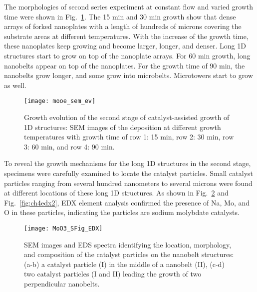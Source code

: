 The morphologies of second series experiment at constant  flow and varied growth time were shown in Fig.~\ref{fig:ch4ev}. The 15 min and 30 min growth show that dense arrays of  forked nanoplates with a length of hundreds of microns covering the substrate areas at different temperatures. With the increase of the growth time, these nanoplates keep growing and become larger, longer, and denser. Long 1D  structures start to grow on top of the nanoplate arrays. For 60 min growth, long nanobelts appear on top of the nanoplates. For the growth time of 90 min, the nanobelts grow longer, and some grow into microbelts. Microtowers start to grow as well.

\begin{figure}[htb]
\centering
\texttt{[image: mooe\_sem\_ev]}
\caption[Growth evolution of the second stage of catalyst-assisted growth of  1D structures]{Growth evolution of the second stage of catalyst-assisted growth of  1D structures: SEM images of the deposition at different growth temperatures with growth time of row 1: 15 min, row 2: 30 min, row 3: 60 min, and row 4: 90 min.}
\label{fig:ch4ev}
\end{figure}

To reveal the growth mechanisms for the long 1D structures in the second stage, specimens were carefully examined to locate the catalyst particles. Small catalyst particles ranging from several hundred nanometers to several microns were found at different locations of these long 1D structures. As shown in Fig.~\ref{fig:ch4edx1} and Fig.~\ref{fig:ch4edx2}, EDX element analysis confirmed the presence of Na, Mo, and O in these particles, indicating the particles are sodium molybdate catalysts.  

\begin{figure}[htb]
\centering
\texttt{[image: MoO3\_SFig\_EDX]}
\caption[SEM images and EDS spectra identifying the location, morphology, and composition of the catalyst particles on the nanobelt structures]{SEM images and EDS spectra identifying the location, morphology, and composition of the catalyst particles on the nanobelt structures: (a-b) a catalyst particle (I) in the middle of a nanobelt (II), (c-d) two catalyst particles (I and II) leading the growth of two perpendicular nanobelts. }
\label{fig:ch4edx1}
\end{figure}

